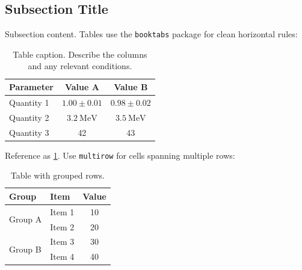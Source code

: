 \subsection{Subsection Title}
\label{sec:N_SECTION_2_SUB_1}

Subsection content. Tables use the \texttt{booktabs} package for clean horizontal rules:

\begin{table}[!ht]
  \centering
  \begin{tabular}{lcc}
    \toprule
    \textbf{Parameter} & \textbf{Value A} & \textbf{Value B} \\
    \midrule
    Quantity 1 & $1.00 \pm 0.01$ & $0.98 \pm 0.02$ \\
    Quantity 2 & $\SI{3.2}{\mega\electronvolt}$ & $\SI{3.5}{\mega\electronvolt}$ \\
    Quantity 3 & 42 & 43 \\
    \bottomrule
  \end{tabular}
  \caption{Table caption. Describe the columns and any relevant conditions.}
  \label{tab:N_example}
\end{table}

Reference as \cref{tab:N_example}. Use \texttt{multirow} for cells spanning multiple rows:

\begin{table}[!ht]
  \centering
  \begin{tabular}{llc}
    \toprule
    \textbf{Group} & \textbf{Item} & \textbf{Value} \\
    \midrule
    \multirow{2}{*}{Group A} & Item 1 & 10 \\
                             & Item 2 & 20 \\
    \multirow{2}{*}{Group B} & Item 3 & 30 \\
                             & Item 4 & 40 \\
    \bottomrule
  \end{tabular}
  \caption{Table with grouped rows.}
  \label{tab:N_multirow}
\end{table}
